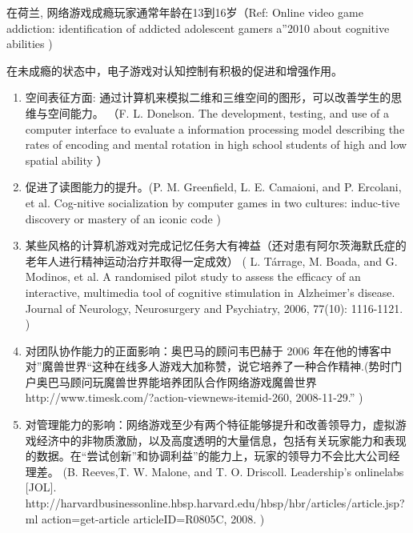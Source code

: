 在荷兰, 网络游戏成瘾玩家通常年龄在13到16岁（Ref: Online video game addiction: identification of addicted adolescent gamers a”2010 about cognitive abilities \cite{})

在未成瘾的状态中，电子游戏对认知控制有积极的促进和增强作用。
\begin{enumerate}
\item 空间表征方面: 通过计算机来模拟二维和三维空间的图形，可以改善学生的思维与空间能力。
（F. L. Donelson. The development, testing, and use of a computer interface to evaluate a information processing model describing the rates of encoding and mental rotation in high school students of high and low spatial ability \cite{}）
\item 促进了读图能力的提升。(P. M. Greenfield, L. E. Camaioni, and P. Ercolani, et al. Cog-nitive socialization by computer games in two cultures: induc-tive discovery or mastery of an iconic code \cite{})

\item 某些风格的计算机游戏对完成记忆任务大有裨益（还对患有阿尔茨海默氏症的老年人进行精神运动治疗并取得一定成效）
                (  L. Tárrage, M. Boada, and G. Modinos, et al. A randomised pilot study to assess the efficacy of an interactive, multimedia tool of cognitive stimulation in Alzheimer’s disease. Journal of Neurology, Neurosurgery and Psychiatry, 2006, 77(10): 1116-1121. \cite{})
\item  对团队协作能力的正面影响：奥巴马的顾问韦巴赫于 2006 年在他的博客中对”魔兽世界“这种在线多人游戏大加称赞，说它培养了一种合作精神.(势时门户奥巴马顾问玩魔兽世界能培养团队合作网络游戏魔兽世界
http://www.timesk.com/?action-viewnews-itemid-260, 2008-11-29.” \cite{})

\item 对管理能力的影响：网络游戏至少有两个特征能够提升和改善领导力，虚拟游戏经济中的非物质激励，以及高度透明的大量信息，包括有关玩家能力和表现的数据。在“尝试创新”和协调利益”的能力上，玩家的领导力不会比大公司经理差。
(B. Reeves,T. W. Malone, and T. O. Driscoll. Leadership’s onlinelabs [JOL]. http://harvardbusinessonline.hbsp.harvard.edu/hbsp/hbr/articles/article.jsp?ml action=get-article articleID=R0805C, 2008. \cite{})
\end{enumerate}





